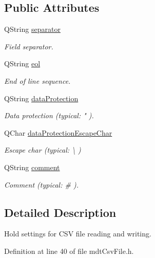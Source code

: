 \subsection*{Public Attributes}
\begin{DoxyCompactItemize}
\item 
Q\-String \hyperlink{structmdt_csv_file_settings_a61eb8e3d43d37e9a21a8ff5aec619cf9}{separator}
\begin{DoxyCompactList}\small\item\em Field separator. \end{DoxyCompactList}\item 
Q\-String \hyperlink{structmdt_csv_file_settings_a559c7042e3eaf2880cb131f627298f81}{eol}
\begin{DoxyCompactList}\small\item\em End of line sequence. \end{DoxyCompactList}\item 
Q\-String \hyperlink{structmdt_csv_file_settings_af966d17d76133bdc26500f95e48898db}{data\-Protection}
\begin{DoxyCompactList}\small\item\em Data protection (typical\-: " ). \end{DoxyCompactList}\item 
Q\-Char \hyperlink{structmdt_csv_file_settings_a8465fa39570d48091a38a1efc8e0c3a2}{data\-Protection\-Escape\-Char}
\begin{DoxyCompactList}\small\item\em Escape char (typical\-: \textbackslash{} ) \end{DoxyCompactList}\item 
Q\-String \hyperlink{structmdt_csv_file_settings_af9230b534ca8275a51a30a06f7c17fde}{comment}
\begin{DoxyCompactList}\small\item\em Comment (typical\-: \# ). \end{DoxyCompactList}\end{DoxyCompactItemize}


\subsection{Detailed Description}
Hold settings for C\-S\-V file reading and writing. 

Definition at line 40 of file mdt\-Csv\-File.\-h.



